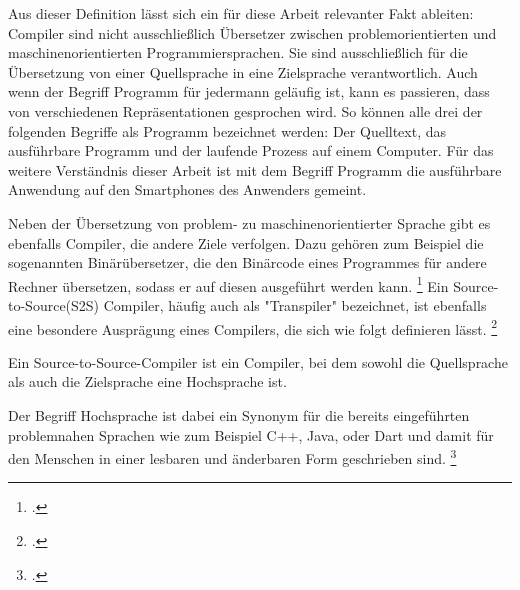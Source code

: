 Aus dieser Definition lässt sich ein für diese Arbeit relevanter Fakt ableiten: Compiler sind nicht ausschließlich Übersetzer  zwischen problemorientierten und maschinenorientierten Programmiersprachen.  Sie sind ausschließlich für die Übersetzung von einer Quellsprache in eine Zielsprache verantwortlich.  Auch wenn der Begriff Programm für jedermann geläufig ist,  kann es  passieren,  dass von verschiedenen Repräsentationen gesprochen wird.  So können alle drei der folgenden Begriffe als Programm bezeichnet werden: Der Quelltext,  das ausführbare Programm und der laufende Prozess auf einem Computer.  Für das weitere Verständnis dieser Arbeit ist mit dem Begriff Programm die ausführbare Anwendung auf den Smartphones des Anwenders gemeint.  

Neben der Übersetzung von problem- zu maschinenorientierter Sprache gibt es ebenfalls Compiler, die andere Ziele verfolgen. Dazu gehören zum Beispiel die sogenannten Binärübersetzer,  die den Binärcode eines Programmes für andere Rechner übersetzen, sodass er auf diesen ausgeführt werden kann.  \footcite[Vgl.][S. 27]{Ullmann2008} Ein Source-to-Source(S2S) Compiler,  häufig auch als "Transpiler" bezeichnet,  ist ebenfalls eine besondere Ausprägung eines Compilers, die sich wie folgt definieren lässt.  \footcite[Vgl.][S. 1629]{IJCSIT2015}
\begin{Def}
Ein Source-to-Source-Compiler ist ein Compiler, bei dem sowohl die Quellsprache als auch die Zielsprache eine Hochsprache ist.
\end{Def}
\vspace{-1em}

Der Begriff Hochsprache ist dabei ein Synonym für die bereits eingeführten problemnahen Sprachen wie zum Beispiel C++,  Java,  \Csharp  oder Dart und damit für den Menschen in einer lesbaren und änderbaren Form geschrieben sind. \footcite[Vgl.][S. 9]{Eisenecker2008} 

